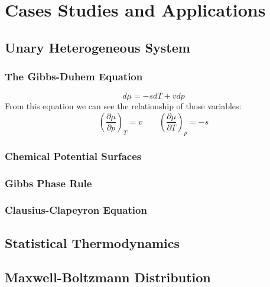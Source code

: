 \documentclass[UTF8]{book}
\begin{document}
\chapter{Cases Studies and Applications}
\epigraph{}{}
\section{Unary Heterogeneous System}
\subsection{The Gibbs-Duhem Equation}
$$d\mu =-sdT+vdp$$
 {From this equation we can see the relationship of those variables:}
$$\left(\dfrac{\partial \mu }{\partial p}\right)_T=v \qquad \left(\dfrac{\partial \mu}{\partial T}\right)_p=-s$$
\subsection{Chemical Potential Surfaces}

\subsection{Gibbs Phase Rule}
\subsection{Clausius-Clapeyron Equation}
\section{Statistical Thermodynamics}
\section{Maxwell-Boltzmann Distribution}
\end{document}
